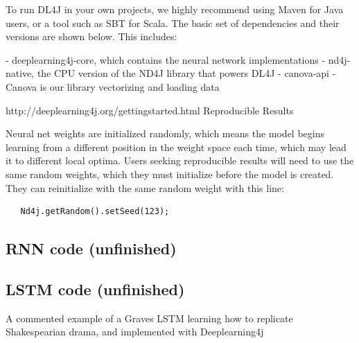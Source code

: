 {To run DL4J in your own projects, we highly recommend using Maven for Java users, or a tool such as SBT for Scala. The basic set of dependencies and their versions are shown below. This includes:

   -  deeplearning4j-core, which contains the neural network implementations
   -  nd4j-native, the CPU version of the ND4J library that powers DL4J
    - canova-api - Canova is our library vectorizing and loading data



http://deeplearning4j.org/gettingstarted.html
Reproducible Results

Neural net weights are initialized randomly, which means the model begins learning from a different position in the weight space each time, which may lead it to different local optima. Users seeking reproducible results will need to use the same random weights, which they must initialize before the model is created. They can reinitialize with the same random weight with this line:

\begin{lstlisting}
   Nd4j.getRandom().setSeed(123);
\end{lstlisting}

\subsection{RNN code (unfinished)}

\subsection{LSTM code (unfinished)}
A commented example of a Graves LSTM learning how to replicate Shakespearian drama, and implemented with Deeplearning4j
}
